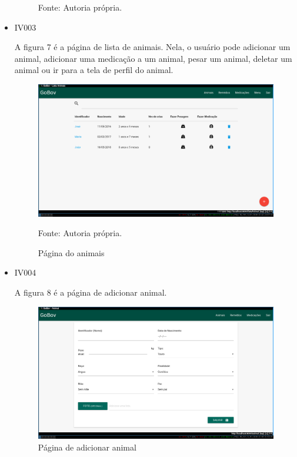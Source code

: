 \begin{itemize}
\begin{figure}[H]
\begin{center}
		Fonte: Autoria própria.
	\end{center}
\end{figure}

\item IV003

A figura 7 é a página de lista de animais. Nela, o usuário pode adicionar um animal, adicionar uma medicação a um animal, pesar um animal, deletar um animal ou ir para a tela de perfil do animal.
\begin{figure}[H]
	\begin{center}
		\caption{Página do animais}
		\includegraphics[width=\textwidth]{../img/prototipos/listaAnimal.png}

		Fonte: Autoria própria.
	\end{center}
\end{figure}

\item IV004

A figura 8 é a página de adicionar animal.
\begin{figure}[H]
	\begin{center}
		\caption{Página de adicionar animal}
		\includegraphics[width=\textwidth]{../img/prototipos/addAnimal.png}


\end{center}
\end{figure}
\end{itemize}
